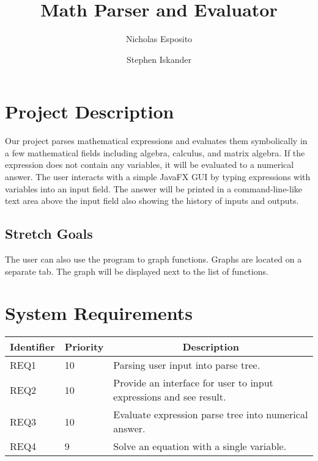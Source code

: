 \documentclass[letterpaper]{article}
\begin{document}
\title{\textbf{Math Parser and Evaluator}}
\author{Nicholas Esposito \and Stephen Iskander}

\maketitle

\section{Project Description}
Our project parses mathematical expressions and evaluates them symbolically in a few mathematical fields including algebra, calculus, and matrix algebra.
If the expression does not contain any variables, it will be evaluated to a numerical answer.
The user interacts with a simple JavaFX GUI by typing expressions with variables into an input field.
The answer will be printed in a command-line-like text area above the input field also showing the history of inputs and outputs.

\subsection{Stretch Goals}
The user can also use the program to graph functions.
Graphs are located on a separate tab.
The graph will be displayed next to the list of functions.


\section{System Requirements}

\begin{tabular}{|l|l|l|}
\hline
\multicolumn{1}{|c|}{\textbf{Identifier}} & \multicolumn{1}{c|}{\textbf{Priority}} & \multicolumn{1}{c|}{\textbf{Description}} \\ \hline
REQ1 & 10 & Parsing user input into parse tree. \\ \hline
REQ2 & 10 & Provide an interface for user to input expressions and see result.\\ \hline
REQ3 & 10 & Evaluate expression parse tree into numerical answer. \\ \hline
REQ4 & 9  & Solve an equation with a single variable. \\ \hline
\end{tabular}
\end{document}
